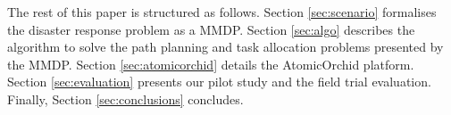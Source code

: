 The rest of this paper is structured as follows. Section \ref{sec:scenario} formalises the disaster response problem as a MMDP. Section \ref{sec:algo}  describes the algorithm to solve the path planning and task allocation problems presented by the MMDP. Section \ref{sec:atomicorchid}  details the AtomicOrchid platform. Section \ref{sec:evaluation} presents our pilot study and the  field trial evaluation.  Finally, Section \ref{sec:conclusions} concludes.